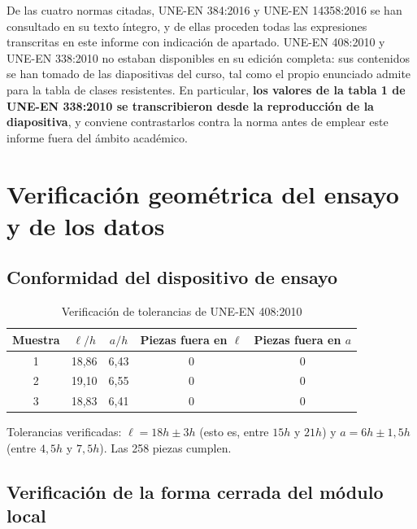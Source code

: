 \documentclass[11pt,a4paper]{article}
\begin{document}
\noindent De las cuatro normas citadas, UNE-EN 384:2016 y UNE-EN 14358:2016 se han
consultado en su texto íntegro, y de ellas proceden todas las expresiones transcritas en
este informe con indicación de apartado. UNE-EN 408:2010 y UNE-EN 338:2010 no estaban
disponibles en su edición completa: sus contenidos se han tomado de las diapositivas del
curso, tal como el propio enunciado admite para la tabla de clases resistentes. En
particular, \textbf{los valores de la tabla 1 de UNE-EN 338:2010 se transcribieron desde
la reproducción de la diapositiva}, y conviene contrastarlos contra la norma antes de
emplear este informe fuera del ámbito académico.

\appendix
\section{Verificación geométrica del ensayo y de los datos}
\label{anx:geometria}

\subsection{Conformidad del dispositivo de ensayo}

\begin{table}[htbp]
\centering
\caption{Verificación de tolerancias de UNE-EN 408:2010}
\begin{tabular}{c c c c c}
\toprule
\textbf{Muestra} & \textbf{$\ell/h$} & \textbf{$a/h$} &
\textbf{Piezas fuera en $\ell$} & \textbf{Piezas fuera en $a$} \\
\midrule
1 & 18,86 & 6,43 & 0 & 0 \\
2 & 19,10 & 6,55 & 0 & 0 \\
3 & 18,83 & 6,41 & 0 & 0 \\
\bottomrule
\end{tabular}
\end{table}

\noindent Tolerancias verificadas: $\ell = 18h \pm 3h$ (esto es, entre $15h$ y $21h$) y
$a = 6h \pm 1{,}5h$ (entre $4{,}5h$ y $7{,}5h$). Las \num{258} piezas cumplen.

\subsection{Verificación de la forma cerrada del módulo local}
\end{document}
